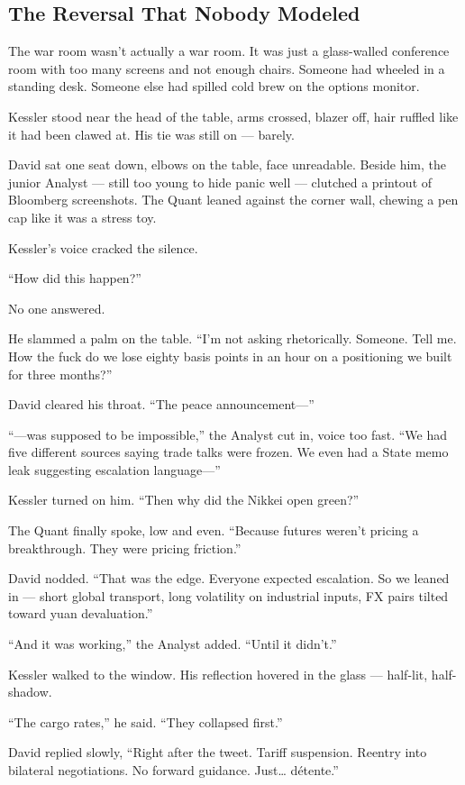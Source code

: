 
\subsection{The Reversal That Nobody Modeled}

The war room wasn’t actually a war room. It was just a glass-walled conference room with too many screens and not enough chairs. Someone had wheeled in a standing desk. Someone else had spilled cold brew on the options monitor.

Kessler stood near the head of the table, arms crossed, blazer off, hair ruffled like it had been clawed at. His tie was still on — barely.

David sat one seat down, elbows on the table, face unreadable. Beside him, the junior Analyst — still too young to hide panic well — clutched a printout of Bloomberg screenshots. The Quant leaned against the corner wall, chewing a pen cap like it was a stress toy.

Kessler’s voice cracked the silence.

“How did this happen?”

No one answered.

He slammed a palm on the table. “I’m not asking rhetorically. Someone. Tell me. How the fuck do we lose eighty basis points in an hour on a positioning we built for three months?”

David cleared his throat. “The peace announcement—”

“—was supposed to be impossible,” the Analyst cut in, voice too fast. “We had five different sources saying trade talks were frozen. We even had a State memo leak suggesting escalation language—”

Kessler turned on him. “Then why did the Nikkei open green?”

The Quant finally spoke, low and even. “Because futures weren’t pricing a breakthrough. They were pricing friction.”

David nodded. “That was the edge. Everyone expected escalation. So we leaned in — short global transport, long volatility on industrial inputs, FX pairs tilted toward yuan devaluation.”

“And it was working,” the Analyst added. “Until it didn’t.”

Kessler walked to the window. His reflection hovered in the glass — half-lit, half-shadow.

“The cargo rates,” he said. “They collapsed first.”

David replied slowly, “Right after the tweet. Tariff suspension. Reentry into bilateral negotiations. No forward guidance. Just… détente.”


